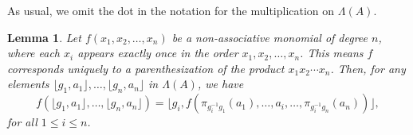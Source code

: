 \documentclass[11pt]{amsart}
\numberwithin{equation}{section}
\newtheorem{lemma}[theorem]{Lemma}
\theoremstyle{definition}
\theoremstyle{remark}
\begin{document}
As usual, we omit the dot in the notation for the  multiplication on \(\Lambda(A)\).


    \begin{lemma} \label{l: nonassociative monomials and Lambda}
    Let \(f(x_1, x_2, \ldots, x_n)\) be a non-associative monomial of degree \(n\), where each \(x_i\) appears exactly once in the order \(x_1, x_2, \ldots, x_n\).
    This means \(f\) corresponds uniquely to a parenthesization of the product \(x_1x_2\cdots x_n\).
    Then, for any elements  \( \lfloor g_1, a_1 \rfloor, \ldots, \lfloor g_n, a_n \rfloor\) in \(\Lambda(A)\), we have
    \[
        f(\lfloor g_1, a_1 \rfloor, \ldots, \lfloor g_n, a_n \rfloor) 
        = \lfloor g_i, f(\pi_{g_i^{-1}g_1}(a_1), \ldots, a_i, \ldots, \pi_{g_i^{-1}g_n}(a_n)) \rfloor,
    \]
    for all \(1 \leq i \leq n\).
\end{lemma}
\end{document}
